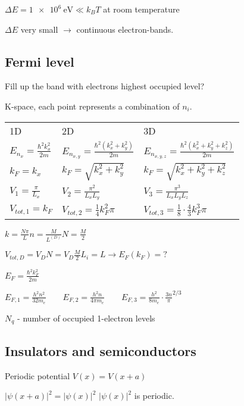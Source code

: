 \documentclass[10pt,a4paper]{scrartcl}
\begin{document}
\begin{multicols*}{3}
	$\Delta E = \SI{1e6}{\electronvolt}\ll k_BT$ at room temperature
	
	$\Delta E$ very small $\rightarrow$ continuous electron-bands.
	
	\subsection{Fermi level}
	
	Fill up the band with electrons \dahe highest occupied level?
	
	K-space, each point represents a combination of $n_i$.
	
	\begin{tabular}{l|l|l}
	1D&2D&3D\\
	$E_{n_x}=\frac{\hbar^2k_x^2}{2m}$&$E_{n_{x,y}}=\frac{\hbar^2(k_x^2+k_y^2)}{2m}$&$E_{n_{x,y,z}}=\frac{\hbar^2(k_x^2+k_y^2+k_z^2)}{2m}$\\
	$k_F=k_x$&$k_F=\sqrt{k_x^2+k_y^2}$&$k_F=\sqrt{k_x^2+k_y^2+k_z^2}$\\
	$V_1=\frac{\pi}{L_x}$&$V_2=\frac{\pi^2}{L_xL_y}$&$V_3=\frac{\pi^3}{L_xL_yL_z}$\\
	$V_{tot,1}=k_F$&$V_{tot,2}=\frac{1}{4}k_F^2\pi$&$V_{tot,3}=\frac{1}{8}\cdot\frac{4}{3}k_F^3\pi$\\
	\end{tabular}
		
	$k=\frac{N\pi}{L}$\hfill$ n=\frac{M}{L^{(D)}}$\hfill$N=\frac{M}{2}$
	
	$V_{tot,D}=V_DN=V_D\frac{M}{2}$\hfill$L_i=L$\hfill$\rightarrow E_F(k_F)=?$
	
	$E_F=\frac{\hbar^2 k_F^2}{2m}$
	
	$E_{F,1}=\frac{h^2 n^2}{32m_e}\qquad E_{F,2}=\frac{h^2n}{4\pi m_e} \qquad E_{F,3}=\frac{h^2}{8m_e}\cdot\frac{3n}{\pi}^{2/3}$
	
	$N_q$ - number of occupied 1-electron levels
	
	
	\subsection{Insulators and semiconductors}
	
	Periodic potential $V(x)=V(x+a)$
	
	$|\psi(x+a)|^2=|\psi(x)|^2$ \dahe $|\psi(x)|^2$ is periodic.
	

\end{multicols*}
\end{document}
